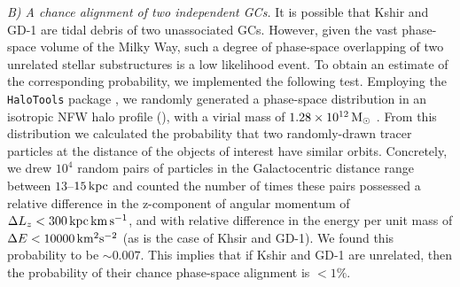 \documentclass[apj]{emulateapj}
\newcommand{\msun}{${\rm M_{\sun}}$}
\def\kms{{\rm\,km\,s^{-1}}}
\def\kpc{{\rm\,kpc}}
\def\msun{{\rm\,M_\odot}}
\begin{document}
{\it B) A chance alignment of two independent GCs.} It is possible that Kshir and GD-1 are tidal debris of two unassociated GCs. However, given the vast phase-space volume of the Milky Way, such a degree of phase-space overlapping of two unrelated stellar substructures is a low likelihood event. To obtain an estimate of the corresponding probability, we implemented the following test. Employing the \texttt{HaloTools} package \citep{Hearin2017_halotools}, we randomly generated a phase-space distribution in an isotropic NFW halo profile (\citealt{NFW1996}), with a virial mass of $1.28\times 10^{12}\msun$ \citep{Watkins2019}. From this distribution we calculated the probability that two randomly-drawn tracer particles at the distance of the objects of interest have similar orbits. Concretely, we drew $10^4$ random pairs of particles in the Galactocentric distance range between $13$--$15\kpc$ and counted the number of times these pairs possessed a relative difference in the z-component of angular momentum of $\Delta L_z <300 \kpc \kms$, and with relative difference in the energy per unit mass of $\Delta E<10000\,{\rm km^2 s^{-2}}$ (as is the case of Khsir and GD-1). We found this probability to be $\sim 0.007$. This implies that if Kshir and GD-1 are unrelated, then the probability of their chance phase-space alignment is $< 1\%$.
\end{document}
